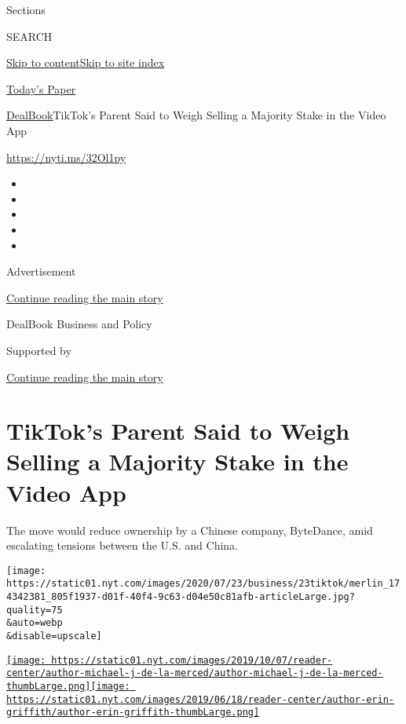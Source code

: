 Sections

SEARCH

\protect\hyperlink{site-content}{Skip to
content}\protect\hyperlink{site-index}{Skip to site index}

\href{https://myaccount.nytimes.com/auth/login?response_type=cookie\&client_id=vi}{}

\href{https://www.nytimes.com/section/todayspaper}{Today's Paper}

\href{/section/business/dealbook}{DealBook}\textbar{}TikTok's Parent
Said to Weigh Selling a Majority Stake in the Video App

\url{https://nyti.ms/32Ol1py}

\begin{itemize}
\item
\item
\item
\item
\item
\end{itemize}

Advertisement

\protect\hyperlink{after-top}{Continue reading the main story}

DealBook Business and Policy

Supported by

\protect\hyperlink{after-sponsor}{Continue reading the main story}

\hypertarget{tiktoks-parent-said-to-weigh-selling-a-majority-stake-in-the-video-app}{%
\section{TikTok's Parent Said to Weigh Selling a Majority Stake in the
Video
App}\label{tiktoks-parent-said-to-weigh-selling-a-majority-stake-in-the-video-app}}

The move would reduce ownership by a Chinese company, ByteDance, amid
escalating tensions between the U.S. and China.

\texttt{[image: https://static01.nyt.com/images/2020/07/23/business/23tiktok/merlin\_174342381\_805f1937-d01f-40f4-9c63-d04e50c81afb-articleLarge.jpg?quality=75\\\&auto=webp\\\&disable=upscale]}

\href{https://www.nytimes.com/by/michael-j-de-la-merced}{\texttt{[image: https://static01.nyt.com/images/2019/10/07/reader-center/author-michael-j-de-la-merced/author-michael-j-de-la-merced-thumbLarge.png]}}\href{https://www.nytimes.com/by/erin-griffith}{\texttt{[image: https://static01.nyt.com/images/2019/06/18/reader-center/author-erin-griffith/author-erin-griffith-thumbLarge.png]}}

